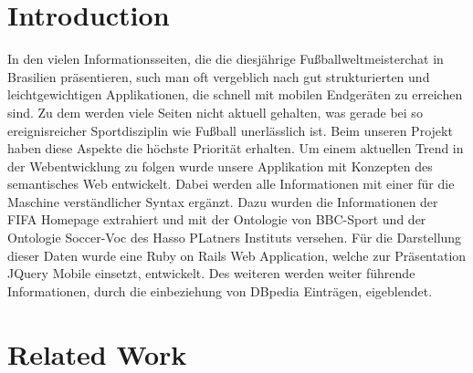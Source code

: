 \documentclass[runningheads,a4paper]{llncs}
\begin{document}
\section{Introduction}

In den vielen Informationsseiten, die die diesjährige Fußballweltmeisterchat in Brasilien präsentieren, such man oft vergeblich nach gut strukturierten und leichtgewichtigen Applikationen, die schnell mit mobilen Endgeräten zu erreichen sind. Zu dem werden viele Seiten nicht aktuell gehalten, was gerade bei so ereignisreicher Sportdisziplin wie Fußball unerlässlich ist. Beim unseren Projekt haben diese Aspekte die höchste Priorität erhalten. Um einem aktuellen Trend in der Webentwicklung zu folgen wurde unsere Applikation mit Konzepten des semantisches Web entwickelt. Dabei werden alle Informationen mit einer für die Maschine verständlicher Syntax ergänzt. Dazu wurden die Informationen der FIFA Homepage extrahiert und mit der Ontologie von BBC-Sport und der Ontologie Soccer-Voc des Hasso PLatners Instituts versehen. Für die Darstellung dieser Daten wurde eine Ruby on Rails Web Application, welche zur Präsentation JQuery Mobile einsetzt, entwickelt. Des weiteren werden weiter führende Informationen, durch die einbeziehung von DBpedia Einträgen, eigeblendet.    


\section{Related Work}
\end{document}
